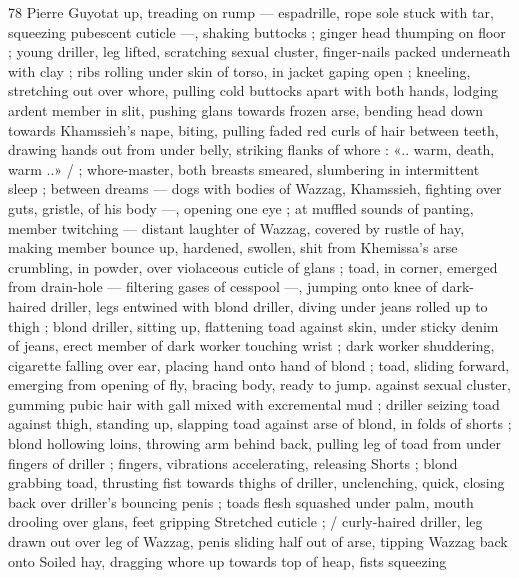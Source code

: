 78 Pierre Guyotat
up, treading on rump — espadrille, rope sole stuck with tar,
squeezing pubescent cuticle —, shaking buttocks ; ginger head
thumping on floor ; young driller, leg lifted, scratching sexual cluster,
finger-nails packed underneath with clay ; ribs rolling under skin of
torso, in jacket gaping open ; kneeling, stretching out over whore,
pulling cold buttocks apart with both hands, lodging ardent member
in slit, pushing glans towards frozen arse, bending head down
towards Khamssieh's nape, biting, pulling faded red curls of hair
between teeth, drawing hands out from under belly, striking flanks of
whore : «.. warm, death, warm ..» / ; whore-master, both breasts
smeared, slumbering in intermittent sleep ; between dreams — dogs
with bodies of Wazzag, Khamssieh, fighting over guts, gristle, of his
body —, opening one eye ; at muffled sounds of panting, member
twitching — distant laughter of Wazzag, covered by rustle of hay,
making member bounce up, hardened, swollen, shit from Khemissa's
arse crumbling, in powder, over violaceous cuticle of glans ; toad, in
corner, emerged from drain-hole — filtering gases of cesspool —,
jumping onto knee of dark-haired driller, legs entwined with blond
driller, diving under jeans rolled up to thigh ; blond driller, sitting up,
flattening toad against skin, under sticky denim of jeans, erect
member of dark worker touching wrist ; dark worker shuddering,
cigarette falling over ear, placing hand onto hand of blond ; toad,
sliding forward, emerging from opening of fly, bracing body, ready to
jump. against sexual cluster, gumming pubic hair with gall mixed with
excremental mud ; driller seizing toad against thigh, standing up,
slapping toad against arse of blond, in folds of shorts ; blond
hollowing loins, throwing arm behind back, pulling leg of toad from
under fingers of driller ; fingers, vibrations accelerating, releasing
Shorts ; blond grabbing toad, thrusting fist towards thighs of driller,
unclenching, quick, closing back over driller's bouncing penis ; toads
flesh squashed under palm, mouth drooling over glans, feet gripping
Stretched cuticle ; / curly-haired driller, leg drawn out over leg of
Wazzag, penis sliding half out of arse, tipping Wazzag back onto
Soiled hay, dragging whore up towards top of heap, fists squeezing

